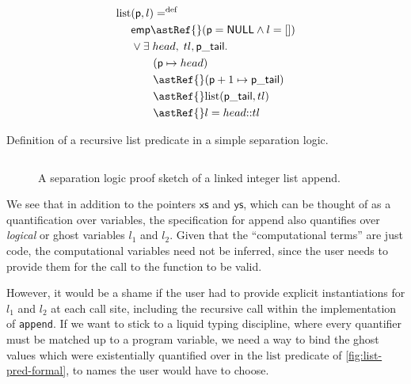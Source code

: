\begin{marginfigure}
    \small%
    \centering
    \begin{align*}
        \mathrm{list} &(\mathsf{p}, l) \mathrel{{=}^\mathrm{def}} \\
                      &\mathsf{emp} \astRef{} (\mathsf{p} = \mathsf{NULL} \wedge{} l = []) \\
                      &\vee{} \exists{} \; {head}, \; {tl}, \mathsf{p\_tail}.\\
                      &\qquad (\mathsf{p} \mapsto{} {head}) \\
                      &\qquad \astRef{} (\mathsf{p} + 1 \mapsto{} \mathsf{p\_tail}) \\
                      &\qquad \astRef{} \mathrm{list} (\mathsf{p\_tail}, {tl}) \\
                      &\qquad \astRef{} l = {head} {:}{:} {tl}
    \end{align*}%
    \caption{Definition of a recursive list predicate in a simple separation
        logic.}\label{fig:list-pred-formal}
\end{marginfigure}

\begin{figure}[tp]
    \inputminted[breaklines,mathescape,fontsize=\small]{py}{code/append_annot.py}
    \caption{A separation logic proof sketch of a linked integer list
        append.}\label{fig:append-annot-formal}
\end{figure}

We see that in addition to the pointers $\mathsf{xs}$ and $\mathsf{ys}$, which
can be thought of as a quantification over  variables, the
specification for append also quantifies over \emph{logical} or ghost variables
$l_1$ and $l_2$. Given that the ``computational terms'' are just code, the
computational variables need not be inferred, since the user needs to provide
them for the call to the function to be valid.

However, it would be a shame if the user had to provide explicit instantiations
for $l_1$ and $l_2$ at each call site, including the recursive call within the
implementation of \texttt{append}. If we want to stick to a liquid
typing discipline, where every quantifier must be matched up to a program
variable, we need a way to bind the ghost values which were existentially
quantified over in the $\mathrm{list}$ predicate of
\cref{fig:list-pred-formal}, to names the user would have to choose.

